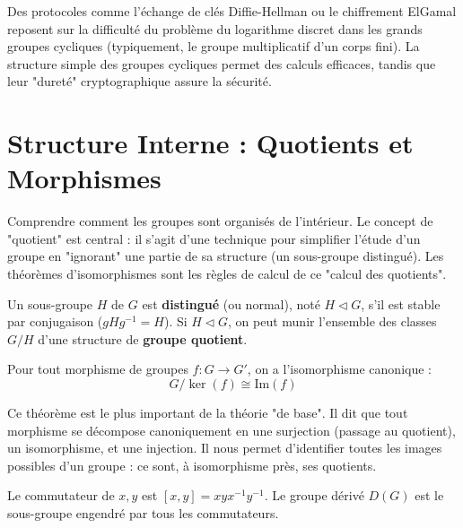 \begin{application}
    Des protocoles comme l'échange de clés Diffie-Hellman ou le chiffrement ElGamal reposent sur la difficulté du problème du logarithme discret dans les grands groupes cycliques (typiquement, le groupe multiplicatif d'un corps fini). La structure simple des groupes cycliques permet des calculs efficaces, tandis que leur "dureté" cryptographique assure la sécurité.
\end{application}

\section{Structure Interne : Quotients et Morphismes}

\begin{objectif}
    Comprendre comment les groupes sont organisés de l'intérieur. Le concept de "quotient" est central : il s'agit d'une technique pour simplifier l'étude d'un groupe en "ignorant" une partie de sa structure (un sous-groupe distingué). Les théorèmes d'isomorphismes sont les règles de calcul de ce "calcul des quotients".
\end{objectif}

\begin{definition}
    Un sous-groupe $H$ de $G$ est \textbf{distingué} (ou normal), noté $H \triangleleft G$, s'il est stable par conjugaison ($gHg^{-1} = H$). Si $H \triangleleft G$, on peut munir l'ensemble des classes $G/H$ d'une structure de \textbf{groupe quotient}.
\end{definition}

\begin{theorem}
    Pour tout morphisme de groupes $f: G \to G'$, on a l'isomorphisme canonique :
    $$ G/\ker(f) \cong \mathrm{Im}(f) $$
\end{theorem}

\begin{remark}
    Ce théorème est le plus important de la théorie "de base". Il dit que tout morphisme se décompose canoniquement en une surjection (passage au quotient), un isomorphisme, et une injection. Il nous permet d'identifier toutes les images possibles d'un groupe : ce sont, à isomorphisme près, ses quotients.
\end{remark}

\begin{definition}
    Le commutateur de $x, y$ est $[x,y] = xyx^{-1}y^{-1}$. Le groupe dérivé $D(G)$ est le sous-groupe engendré par tous les commutateurs.
\end{definition}

